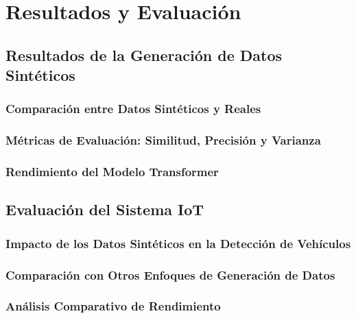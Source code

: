 \chapter{Resultados y Evaluación}

\section{Resultados de la Generación de Datos Sintéticos}
\subsection{Comparación entre Datos Sintéticos y Reales}
\subsection{Métricas de Evaluación: Similitud, Precisión y Varianza}
\subsection{Rendimiento del Modelo Transformer}

\section{Evaluación del Sistema IoT}
\subsection{Impacto de los Datos Sintéticos en la Detección de Vehículos}
\subsection{Comparación con Otros Enfoques de Generación de Datos}
\subsection{Análisis Comparativo de Rendimiento}
